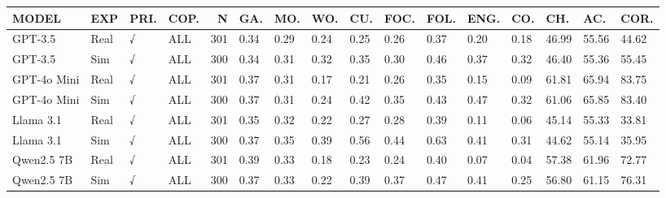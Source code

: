 \begin{tabular}{llllrlllllllllll}
\toprule
MODEL & EXP & PRI. & COP. & N & GA. & MO. & WO. & CU. & FOC. & FOL. & ENG. & CO. & CH. & AC. & COR. \\
\midrule
GPT-3.5 & Real & √ & ALL & 301 & 0.34 & 0.29 & 0.24 & 0.25 & 0.26 & 0.37 & 0.20 & 0.18 & 46.99 & 55.56 & 44.62 \\
GPT-3.5 & Sim & √ & ALL & 300 & 0.34 & 0.31 & 0.32 & 0.35 & 0.30 & 0.46 & 0.37 & 0.32 & 46.40 & 55.36 & 55.45 \\
GPT-4o Mini & Real & √ & ALL & 301 & 0.37 & 0.31 & 0.17 & 0.21 & 0.26 & 0.35 & 0.15 & 0.09 & 61.81 & 65.94 & 83.75 \\
GPT-4o Mini & Sim & √ & ALL & 300 & 0.37 & 0.31 & 0.24 & 0.42 & 0.35 & 0.43 & 0.47 & 0.32 & 61.06 & 65.85 & 83.40 \\
Llama 3.1 & Real & √ & ALL & 301 & 0.35 & 0.32 & 0.22 & 0.27 & 0.28 & 0.39 & 0.11 & 0.06 & 45.14 & 55.33 & 33.81 \\
Llama 3.1 & Sim & √ & ALL & 300 & 0.37 & 0.35 & 0.39 & 0.56 & 0.44 & 0.63 & 0.41 & 0.31 & 44.62 & 55.14 & 35.95 \\
Qwen2.5 7B & Real & √ & ALL & 301 & 0.39 & 0.33 & 0.18 & 0.23 & 0.24 & 0.40 & 0.07 & 0.04 & 57.38 & 61.96 & 72.77 \\
Qwen2.5 7B & Sim & √ & ALL & 300 & 0.37 & 0.33 & 0.22 & 0.39 & 0.37 & 0.47 & 0.41 & 0.25 & 56.80 & 61.15 & 76.31 \\
\bottomrule
\end{tabular}
